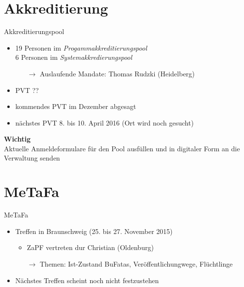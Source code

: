 \documentclass[compress,]{beamer}
\begin{document}
\section{Akkreditierung}

\begin{frame}{Akkreditierungspool}
	\begin{itemize}
		\item 19 Personen im \emph{Progammakkreditierungspool}\\
			6 Personen im \emph{Systemakkredierungspool}
			\begin{itemize}
				\item[$\rightarrow$] Auslaufende Mandate: Thomas Rudzki (Heidelberg)
			\end{itemize}
		\item PVT ??
		\item kommendes PVT im Dezember abgesagt
		\item nächstes PVT 8. bis 10. April 2016 (Ort wird noch gesucht)
	\end{itemize}
\end{frame}

\begin{frame}
	\begin{framed}
		\begin{center}
			{\Huge \textbf{Wichtig}}\\
			\vspace{0.5cm}
			{\Large Aktuelle Anmeldeformulare für den Pool ausfüllen und in digitaler Form an die Verwaltung senden}
		\end{center}
	\end{framed}
\end{frame}

\section{MeTaFa}

\begin{frame}{MeTaFa}
	\begin{itemize}
		\item Treffen in Braunschweig (25. bis 27. November 2015)
			\begin{itemize}
				\item ZaPF vertreten dur Christian (Oldenburg)
				\item[$\rightarrow$] Themen: Ist-Zustand BuFatas, Veröffentlichungwege, Flüchtlinge
			\end{itemize}
		\item Nächstes Treffen scheint noch nicht festzustehen
	\end{itemize}
\end{frame}
\end{document}
